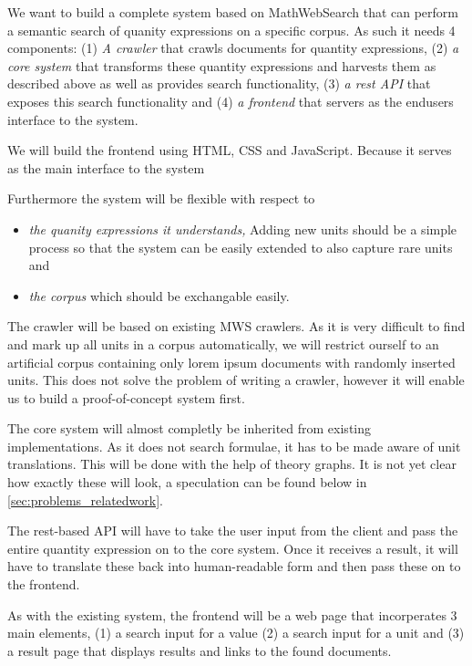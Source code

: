 \documentclass[11pt]{article}
\begin{document}
We want to build a complete system based on MathWebSearch that can perform a semantic search of quanity expressions on a specific corpus. As such it needs 4 components: (1) \textit{A crawler} that crawls documents for quantity expressions, (2) \textit{a core system} that transforms these quantity expressions and harvests them as described above as well as provides search functionality, (3) \textit{a rest API} that exposes this search functionality and (4) \textit{a frontend} that servers as the endusers interface to the system.




We will build the frontend using HTML, CSS and JavaScript. Because it serves as the main interface to the system


Furthermore the system will be flexible with respect to
\begin{itemize}
  \item \textit{the quanity expressions it understands, } Adding new units should be a simple process so that the system can be easily extended to also capture rare units and
  \item \textit{the corpus} which should be exchangable easily.
\end{itemize}

The crawler will be based on existing MWS crawlers. As it is very difficult to find and mark up all units in a corpus automatically, we will restrict ourself to an artificial corpus containing only lorem ipsum documents with randomly inserted units. This does not solve the problem of writing a crawler, however it will enable us to build a proof-of-concept system first.

The core system will almost completly be inherited from existing implementations. As it does not search formulae, it has to be made aware of unit translations. This will be done with the help of theory graphs. It is not yet clear how exactly these will look, a speculation can be found below in \ref{sec:problems_relatedwork}.

The rest-based API will have to take the user input from the client and pass the entire quantity expression on to the core system. Once it receives a result, it will have to translate these back into human-readable form and then pass these on to the frontend.

As with the existing system, the frontend will be a web page that incorperates 3 main elements, (1) a search input for a value (2) a search input for a unit and (3) a result page that displays results and links to the found documents.
\end{document}
